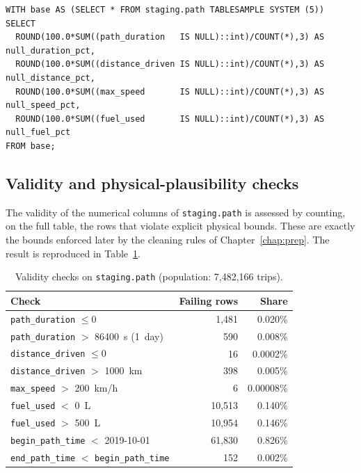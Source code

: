\begin{lstlisting}[style=sql,caption={Null-rate analysis on a sample of \texttt{staging.path}.},label={lst:null-rate}]
WITH base AS (SELECT * FROM staging.path TABLESAMPLE SYSTEM (5))
SELECT
  ROUND(100.0*SUM((path_duration   IS NULL)::int)/COUNT(*),3) AS null_duration_pct,
  ROUND(100.0*SUM((distance_driven IS NULL)::int)/COUNT(*),3) AS null_distance_pct,
  ROUND(100.0*SUM((max_speed       IS NULL)::int)/COUNT(*),3) AS null_speed_pct,
  ROUND(100.0*SUM((fuel_used       IS NULL)::int)/COUNT(*),3) AS null_fuel_pct
FROM base;
\end{lstlisting}

\subsection{Validity and physical-plausibility checks}
The validity of the numerical columns of \texttt{staging.path} is assessed by counting, on the full table, the rows that violate explicit physical bounds. These are exactly the bounds enforced later by the cleaning rules of Chapter~\ref{chap:prep}. The result is reproduced in Table~\ref{tab:validity-checks}.

\begin{table}[h]
\centering
\caption{Validity checks on \texttt{staging.path} (population: 7{,}482{,}166 trips).}
\label{tab:validity-checks}
\begin{tabular}{|l|r|r|}
\hline
\textbf{Check} & \textbf{Failing rows} & \textbf{Share} \\
\hline
\texttt{path\_duration} $\le 0$                  &  1{,}481 & 0.020\% \\
\texttt{path\_duration} $>$ 86400~s (1~day)      &    590  & 0.008\% \\
\texttt{distance\_driven} $\le 0$                &     16  & 0.0002\% \\
\texttt{distance\_driven} $>$ 1000~km            &    398  & 0.005\% \\
\texttt{max\_speed} $>$ 200~km/h                 &      6  & 0.00008\% \\
\texttt{fuel\_used} $<$ 0~L                      & 10{,}513 & 0.140\% \\
\texttt{fuel\_used} $>$ 500~L                    & 10{,}954 & 0.146\% \\
\texttt{begin\_path\_time} $<$ 2019-10-01        & 61{,}830 & 0.826\% \\
\texttt{end\_path\_time} $<$ \texttt{begin\_path\_time} & 152 & 0.002\% \\
\hline
\end{tabular}
\end{table}

